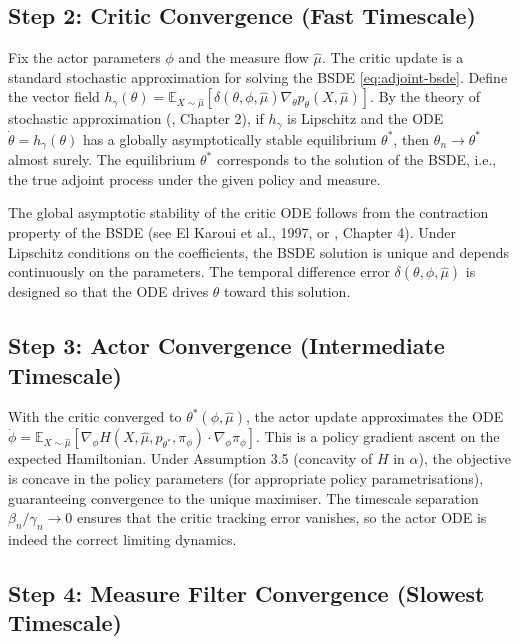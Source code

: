 \subsection{Step 2: Critic Convergence (Fast Timescale)}

Fix the actor parameters $\phi$ and the measure flow $\hat\mu$. The critic update is a
standard stochastic approximation for solving the BSDE \eqref{eq:adjoint-bsde}.
Define the vector field $h_\gamma(\theta) = \mathbb{E}_{X \sim \hat\mu}[\delta(\theta,
\phi, \hat\mu) \nabla_\theta p_\theta(X, \hat\mu)]$. By the theory of stochastic
approximation (\citep{borkar2008}, Chapter 2), if $h_\gamma$ is Lipschitz and the ODE
$\dot\theta = h_\gamma(\theta)$ has a globally asymptotically stable equilibrium
$\theta^*$, then $\theta_n \to \theta^*$ almost surely. The equilibrium $\theta^*$
corresponds to the solution of the BSDE, i.e., the true adjoint process under the
given policy and measure.

The global asymptotic stability of the critic ODE follows from the contraction
property of the BSDE (see El Karoui et al., 1997, or \citep{zhang2017}, Chapter 4). Under
Lipschitz conditions on the coefficients, the BSDE solution is unique and depends
continuously on the parameters. The temporal difference error $\delta(\theta, \phi,
\hat\mu)$ is designed so that the ODE drives $\theta$ toward this solution.

\subsection{Step 3: Actor Convergence (Intermediate Timescale)}

With the critic converged to $\theta^*(\phi, \hat\mu)$, the actor update approximates
the ODE $\dot\phi = \mathbb{E}_{X \sim \hat\mu}[\nabla_\phi H(X, \hat\mu, p_{\theta^*},
\pi_\phi) \cdot \nabla_\phi \pi_\phi]$. This is a policy gradient ascent on the
expected Hamiltonian. Under Assumption 3.5 (concavity of $H$ in $\alpha$), the
objective is concave in the policy parameters (for appropriate policy
parametrisations), guaranteeing convergence to the unique maximiser. The timescale
separation $\beta_n/\gamma_n \to 0$ ensures that the critic tracking error vanishes,
so the actor ODE is indeed the correct limiting dynamics.

\subsection{Step 4: Measure Filter Convergence (Slowest Timescale)}

